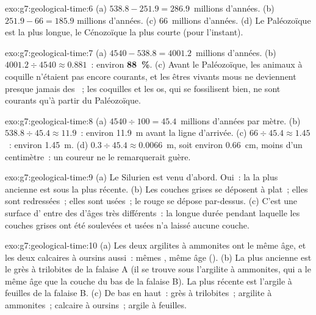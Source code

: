 \begin{solution}{exo:g7:geological-time:6}
(a) $538.8 - 251.9 = 286.9$~millions d'années. (b) $251.9 - 66 = 185.9$
millions d'années. (c) 66~millions d'années. (d) Le Paléozoïque est la
plus longue, le Cénozoïque la plus courte (pour l'instant).
\end{solution}

\begin{solution}{exo:g7:geological-time:7}
(a) $4540 - 538.8 = 4001.2$~millions d'années. (b) $4001.2 \div 4540
\approx 0.881$~: environ \textbf{88~\%}. (c) Avant le Paléozoïque, les
animaux à coquille n'étaient pas encore courants, et les êtres vivants
mous ne deviennent presque jamais des ~; les coquilles et les os,
qui se fossilisent bien, ne sont courants qu'à partir du Paléozoïque.
\end{solution}

\begin{solution}{exo:g7:geological-time:8}
(a) $4540 \div 100 = 45.4$~millions d'années par mètre. (b) $538.8 \div 45.4
\approx 11.9$~: environ \qty{11.9}{m} avant la ligne d'arrivée. (c) $66 \div
45.4 \approx 1.45$~: environ \qty{1.45}{m}. (d) $0.3 \div 45.4 \approx
0.0066$~m, soit environ \qty{0.66}{cm}, moins d'un centimètre~: un coureur
ne le remarquerait guère.
\end{solution}

\begin{solution}{exo:g7:geological-time:9}
(a) Le Silurien est venu d'abord. Oui~: la  la plus ancienne est sous
la plus récente. (b) Les couches grises se déposent à plat~; elles sont
redressées~; elles sont usées~; le  rouge se dépose par-dessus. (c)
C'est une surface d' entre des  d'âges très différents~: la
longue durée pendant laquelle les couches grises ont été soulevées et
usées n'a laissé aucune couche.
\end{solution}

\begin{solution}{exo:g7:geological-time:10}
(a) Les deux argilites à ammonites ont le même âge, et les deux calcaires
à oursins aussi~: mêmes , même âge (). (b) La plus ancienne est le grès à trilobites de la
falaise A (il se trouve sous l'argilite à ammonites, qui a le même âge que
la couche du bas de la falaise B). La plus récente est l'argile à feuilles
de la falaise B. (c) De bas en haut~: grès à trilobites~; argilite à
ammonites~; calcaire à oursins~; argile à feuilles.
\end{solution}

